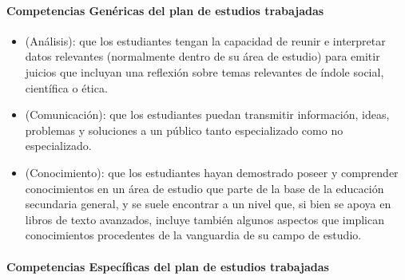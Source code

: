 \paragraph{Competencias Genéricas del plan de estudios trabajadas}

\begin{itemize}
\item (Análisis): que los estudiantes tengan la capacidad de reunir e interpretar datos relevantes (normalmente dentro de su área de estudio) para emitir juicios que incluyan una reflexión sobre temas relevantes de índole social, científica o ética.
\item (Comunicación): que los estudiantes puedan transmitir información, ideas, problemas y soluciones a un público tanto especializado como no especializado.
\item (Conocimiento): que los estudiantes hayan demostrado poseer y comprender conocimientos en un área de estudio que parte de la base de la educación secundaria general, y se suele encontrar a un nivel que, si bien se apoya en
libros de texto avanzados, incluye también algunos aspectos que implican conocimientos procedentes de la vanguardia de su campo de estudio.
\end{itemize}

\paragraph{Competencias Específicas del plan de estudios trabajadas}

